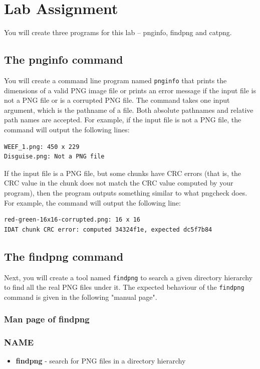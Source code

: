 \section{Lab Assignment}

You will create three programs for this lab -- pnginfo, findpng and catpng.

\subsection{The pnginfo command}
You will create a command line program named \verb+pnginfo+ that prints the dimensions of a valid PNG image file or prints an error message if the input file is not a PNG file or is a corrupted PNG file. The command takes one input argument, which is the pathname of a file. Both absolute pathnames and relative path names are accepted. For example, if the input file is not a PNG file, the command  will output the following lines: 
\begin{verbatim}
WEEF_1.png: 450 x 229 
Disguise.png: Not a PNG file 
\end{verbatim}
If the input file is a PNG file, but some chunks have CRC errors (that is, the CRC value in the chunk does not match the CRC value computed by your program), then the program outputs something similar to what pngcheck does. For example, the command  will output the following line:
\begin{verbatim}
red-green-16x16-corrupted.png: 16 x 16 
IDAT chunk CRC error: computed 34324f1e, expected dc5f7b84
\end{verbatim}

\subsection{The findpng command}
Next, you will create a tool named \verb+findpng+ to search a given directory hierarchy to find all the real PNG files under it.
The expected behaviour of the \verb+findpng+ command is given in the following "manual page".
\subsubsection{Man page of findpng}
\subsubsection*{NAME}
\begin{itemize}
	\item[]{\bf findpng} - search for PNG files in a directory hierarchy
\end{itemize}
